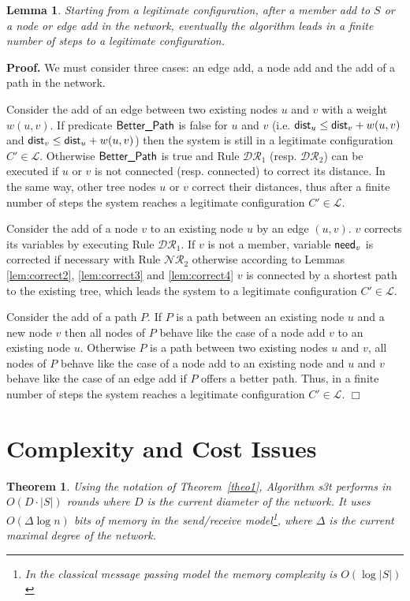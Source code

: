 \documentclass[11pt]{article}
\newtheorem{theorem}{Theorem}
\newtheorem{lemma}{Lemma}
\newenvironment{proof}{\noindent \begin{rm}{\textbf{Proof.} }}{\hspace*{\fill}$\Box$\par\end{rm} \vspace{.3cm}}
\newcommand{\dist}{\mbox{\sf dist}}
\newcommand{\need}{\mbox{\sf need}}
\newcommand{\Better}{\mbox{\sf Better\_Path}}
\newcommand{\ARA}{$\mathcal{DR}_1$}
\newcommand{\ARB}{$\mathcal{DR}_2$}
\newcommand{\CRC}{$\mathcal{NR}_2$}
\newcommand{\STT}{{\sc s3t}}
\begin{document}
\begin{lemma}
\label{lem:dyn_ajout}
Starting from a legitimate configuration, after a
member add to $S$ or a node or edge add in the network, eventually the
algorithm leads in a finite number of steps to a legitimate
configuration.
\end{lemma}

\begin{proof}
We must consider three cases: an edge add, a node add and the add of a path in the network.

Consider the add of an edge between two existing nodes $u$ and $v$
with a weight $w(u,v)$. If predicate $\Better$ is false for $u$
and $v$ (i.e. $\dist_u \leq \dist_v + w(u,v)$ and $\dist_v \leq \dist_u +
w(u,v)$) then the system is still in a legitimate configuration $C'
\in \mathcal{L}$. Otherwise $\Better$ is true and Rule \ARA\/
(resp. \ARB\/) can be executed if $u$ or $v$ is not connected
(resp. connected) to correct its distance. In the same way, other tree
nodes $u$ or $v$ correct their distances, thus after a finite number
of steps the system reaches a legitimate configuration $C' \in
\mathcal{L}$.

Consider the add of a node $v$ to an existing node $u$ by an edge
$(u,v)$. $v$ corrects its variables by executing Rule \ARA\/. If $v$ is
not a member, variable $\need_v$ is corrected if necessary with Rule \CRC\/
otherwise according to Lemmas \ref{lem:correct2}, \ref{lem:correct3}
and \ref{lem:correct4} $v$ is connected by a shortest path to the
existing tree, which leads the system to a legitimate configuration
$C' \in \mathcal{L}$.

Consider the add of a path $P$. If $P$ is a path between an existing
node $u$ and a new node $v$ then all nodes of $P$ behave like the case
of a node add $v$ to an existing node $u$. Otherwise $P$ is a path
between two existing nodes $u$ and $v$, all nodes of $P$ behave like
the case of a node add to an existing node and $u$ and $v$ behave like
the case of an edge add if $P$ offers a better path. Thus, in a finite
number of steps the system reaches a legitimate configuration $C' \in
\mathcal{L}$.
\end{proof}

\section*{Complexity and Cost Issues}
\begin{theorem}
Using the notation of Theorem~\ref{theo1}, 
Algorithm \STT\/ performs in $O(D\cdot |S|)$ rounds where $D$
 is the current diameter of the
network. It uses $O(\Delta \log n)$ bits of memory in
the send/receive model\footnote{In the classical message passing model
the memory complexity is $O(\log |S|)$}, where $\Delta$ is the current maximal degree of the
network.
\end{theorem}
\end{document}

